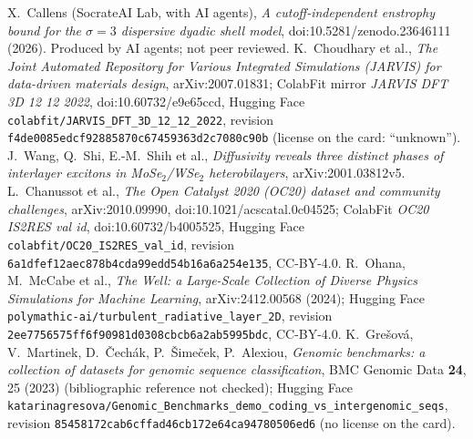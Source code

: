  X.~Callens (SocrateAI Lab, with AI agents), \emph{A cutoff-independent enstrophy bound for the
$\sigma=3$ dispersive dyadic shell model}, doi:10.5281/zenodo.23646111 (2026). Produced by AI agents; not peer reviewed.
 K.~Choudhary et al., \emph{The Joint Automated Repository for Various Integrated Simulations (JARVIS) for
data-driven materials design}, arXiv:2007.01831; ColabFit mirror \emph{JARVIS DFT 3D 12 12 2022}, doi:10.60732/e9e65ccd,
Hugging Face \texttt{colabfit/JARVIS\_DFT\_3D\_12\_12\_2022}, revision \texttt{f4de0085edcf92885870c67459363d2c7080c90b}
(license on the card: ``unknown'').
 J.~Wang, Q.~Shi, E.-M.~Shih et al., \emph{Diffusivity reveals three distinct phases of interlayer excitons
in MoSe$_2$/WSe$_2$ heterobilayers}, arXiv:2001.03812v5.
 L.~Chanussot et al., \emph{The Open Catalyst 2020 (OC20) dataset and community challenges},
arXiv:2010.09990, doi:10.1021/acscatal.0c04525; ColabFit \emph{OC20 IS2RES val id}, doi:10.60732/b4005525,
Hugging Face \texttt{colabfit/OC20\_IS2RES\_val\_id}, revision \texttt{6a1dfef12aec878b4cda99edd54b16a6a254e135},
CC-BY-4.0.
 R.~Ohana, M.~McCabe et al., \emph{The Well: a Large-Scale Collection of Diverse Physics Simulations for
Machine Learning}, arXiv:2412.00568 (2024); Hugging Face \texttt{polymathic-ai/turbulent\_radiative\_layer\_2D}, revision
\texttt{2ee7756575ff6f90981d0308cbcb6a2ab5995bdc}, CC-BY-4.0.
 K.~Grešová, V.~Martinek, D.~Čechák, P.~Šimeček, P.~Alexiou, \emph{Genomic benchmarks: a collection of
datasets for genomic sequence classification}, BMC Genomic Data \textbf{24}, 25 (2023) (bibliographic reference not checked); Hugging Face
\texttt{katarinagresova/Genomic\_Benchmarks\_demo\_coding\_vs\_intergenomic\_seqs}, revision
\texttt{85458172cab6cffad46cb172e64ca94780506ed6} (no license on the card).
